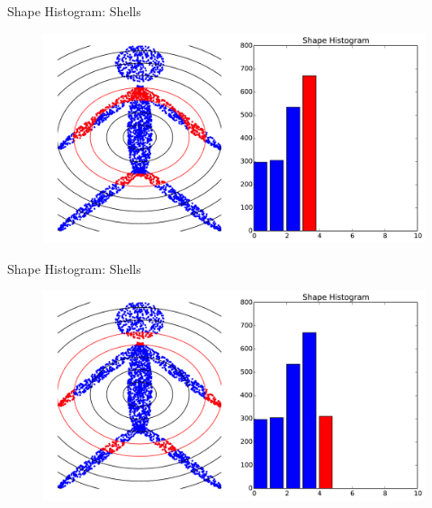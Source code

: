 \documentclass{beamer}
\begin{document}
\begin{frame}{Shape Histogram: Shells}

\begin{figure}[t]
	\centering
    \includegraphics[width=\textwidth]{ShapeHist4.pdf}
\end{figure}

\end{frame}

\begin{frame}{Shape Histogram: Shells}

\begin{figure}[t]
	\centering
    \includegraphics[width=\textwidth]{ShapeHist5.pdf}
\end{figure}

\end{frame}
\end{document}
